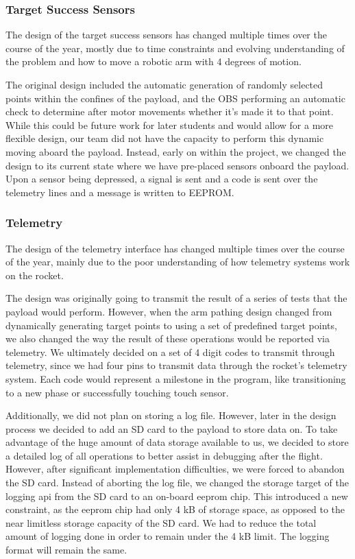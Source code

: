 \subsubsection{Target Success Sensors}
The design of the target success sensors has changed multiple times over the course of the year,
mostly due to time constraints and evolving understanding of the problem and how to move a robotic arm with 4
degrees of motion.

The original design included the automatic generation of randomly selected points within the confines of the payload,
and the \gls{OBS} performing an automatic check to determine after motor movements whether it's made it to that point. While
this could be future work for later students and would allow for a more flexible design, our team did not have the capacity
to perform this dynamic moving aboard the \gls{payload}. Instead, early on within the project, we changed the design to its current state
where we have pre-placed sensors onboard the \gls{payload}. Upon a sensor being depressed, a signal is sent and a code is sent over 
the telemetry lines and a message is written to EEPROM.

\subsubsection{Telemetry}
The design of the telemetry interface has changed multiple times over the
course of the year, mainly due to the poor understanding of how telemetry systems
work on the rocket.

The design was originally going to transmit the result of a series of tests
that the \gls{payload} would perform.
However, when the arm pathing design changed from dynamically generating target 
points to using a set of predefined target points, we also changed the way the
result of these operations would be reported via telemetry.
We ultimately decided on a set of 4 digit codes to transmit through telemetry,
since we had four pins to transmit data through the rocket's telemetry system.
Each code would represent a milestone in the program, like transitioning to a
new phase or successfully touching touch sensor.

Additionally, we did not plan on storing a log file.
However, later in the design process we decided to add an SD card to the
\gls{payload} to store data on.
To take advantage of the huge amount of data storage available to us, we
decided to store a detailed log of all operations to better assist in debugging
after the flight.
However, after significant implementation difficulties, we were forced to
abandon the SD card.
Instead of aborting the log file, we changed the storage target of the logging
\gls{api} from the SD card to an on-board \gls{eeprom} chip.
This introduced a new constraint, as the \gls{eeprom} chip had only 4 kB of
storage space, as opposed to the near limitless storage capacity of the SD 
card.
We had to reduce the total amount of logging done in order to remain under
the 4 kB limit.
The logging format will remain the same.

